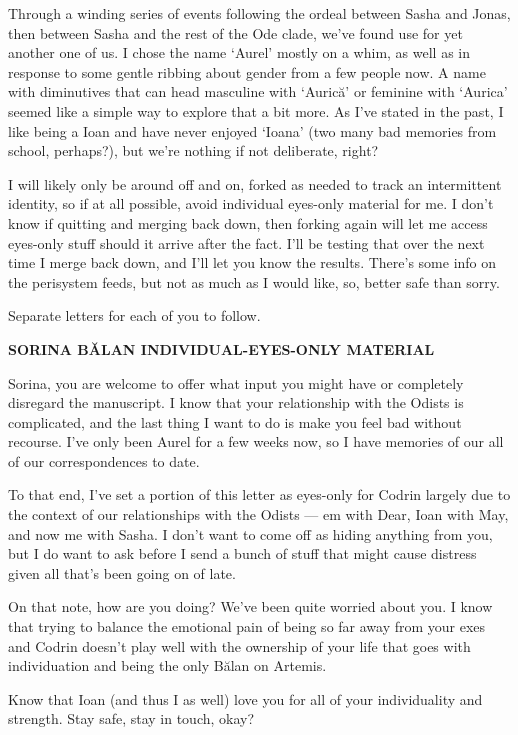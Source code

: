 Through a winding series of events following the ordeal between Sasha and Jonas, then between Sasha and the rest of the Ode clade, we've found use for yet another one of us. I chose the name `Aurel' mostly on a whim, as well as in response to some gentle ribbing about gender from a few people now. A name with diminutives that can head masculine with `Aurică' or feminine with `Aurica' seemed like a simple way to explore that a bit more. As I've stated in the past, I like being a Ioan and have never enjoyed `Ioana' (two many bad memories from school, perhaps?), but we're nothing if not deliberate, right?

I will likely only be around off and on, forked as needed to track an intermittent identity, so if at all possible, avoid individual eyes-only material for me. I don't know if quitting and merging back down, then forking again will let me access eyes-only stuff should it arrive after the fact. I'll be testing that over the next time I merge back down, and I'll let you know the results. There's some info on the perisystem feeds, but not as much as I would like, so, better safe than sorry.

Separate letters for each of you to follow.

\textbf{SORINA BĂLAN INDIVIDUAL-EYES-ONLY MATERIAL}

Sorina, you are welcome to offer what input you might have or completely disregard the manuscript. I know that your relationship with the Odists is complicated, and the last thing I want to do is make you feel bad without recourse. I've only been Aurel for a few weeks now, so I have memories of our all of our correspondences to date.

To that end, I've set a portion of this letter as eyes-only for Codrin largely due to the context of our relationships with the Odists — em with Dear, Ioan with May, and now me with Sasha. I don't want to come off as hiding anything from you, but I do want to ask before I send a bunch of stuff that might cause distress given all that's been going on of late.

On that note, how are you doing? We've been quite worried about you. I know that trying to balance the emotional pain of being so far away from your exes and Codrin doesn't play well with the ownership of your life that goes with individuation and being the only Bălan on Artemis.

Know that Ioan (and thus I as well) love you for all of your individuality and strength. Stay safe, stay in touch, okay?

